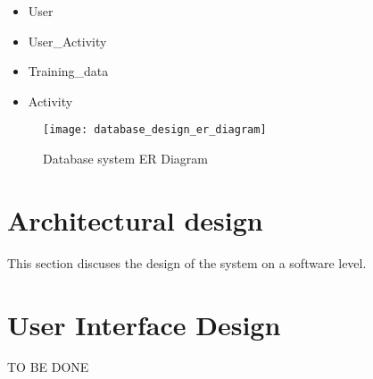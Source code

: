     \begin{itemize}
        \item User
        \item {User\_Activity}
        \item {Training\_data}
        \item {Activity}
    \end{itemize}
    
     \begin{figure}
        \centering
        \texttt{[image: database\_design\_er\_diagram]}
        \caption{Database system ER Diagram}
        \label{fig:database_design_er_diagram}
    \end{figure}
    
    \section{Architectural design}
    This section discuses the design of the system on a software level.
    
        
    \section{User Interface Design}
    TO BE DONE